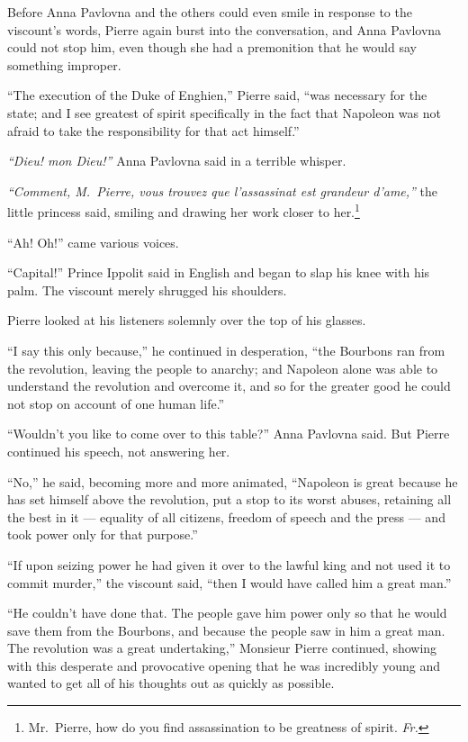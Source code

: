 Before Anna Pavlovna and the others could even smile in response to the viscount's words, Pierre again burst into the conversation, and Anna Pavlovna could not stop him, even though she had a premonition that he would say something improper.

``The execution of the Duke of Enghien,'' Pierre said, ``was necessary for the state; and I see greatest of spirit specifically in the fact that Napoleon was not afraid to take the responsibility for that act himself.'' %

\textit{``Dieu! mon Dieu!''} Anna Pavlovna said in a terrible whisper.

\textit{``Comment, M.~Pierre, vous trouvez que l'assassinat est grandeur d'ame,''} the little princess said, smiling and drawing her work closer to her.\footnote{Mr.~Pierre, how do you find assassination to be greatness of spirit. \textit{Fr.}}

``Ah! Oh!'' came various voices.

``Capital!'' Prince Ippolit said in English and began to slap his knee with his palm. The viscount merely shrugged his shoulders.

Pierre looked at his listeners solemnly over the top of his glasses.

``I say this only because,'' he continued in desperation, ``the Bourbons ran from the revolution, leaving the people to anarchy; and Napoleon alone was able to understand the revolution and overcome it, and so for the greater good he could not stop on account of one human life.'' %

``Wouldn't you like to come over to this table?'' Anna Pavlovna said. But Pierre continued his speech, not answering her. %

``No,'' he said, becoming more and more animated, ``Napoleon is great because he has set himself above the revolution, put a stop to its worst abuses, retaining all the best in it --- equality of all citizens, freedom of speech and the press --- and took power only for that purpose.'' %

``If upon seizing power he had given it over to the lawful king and not used it to commit murder,'' the viscount said, ``then I would have called him a great man.'' %

``He couldn't have done that. The people gave him power only so that he would save them from the Bourbons, and because the people saw in him a great man. The revolution was a great undertaking,'' Monsieur Pierre continued, showing with this desperate and provocative opening that he was incredibly young and wanted to get all of his thoughts out as quickly as possible. %

